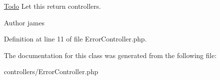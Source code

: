 \begin{Desc}
\item[\hyperlink{todo__todo000002}{Todo}]Let this return controllers. \end{Desc}
\begin{DoxyAuthor}{Author}
james 
\end{DoxyAuthor}


Definition at line 11 of file ErrorController.php.



The documentation for this class was generated from the following file:\begin{DoxyCompactItemize}
\item 
controllers/ErrorController.php\end{DoxyCompactItemize}
